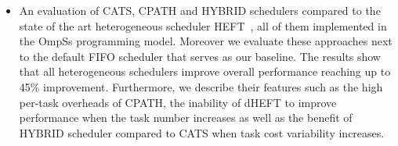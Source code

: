 \begin{itemize}
 \item{An evaluation of CATS, CPATH and HYBRID schedulers compared to the state of the art heterogeneous scheduler HEFT~\cite{HEFT}, all of them implemented in the OmpSs programming model. Moreover we evaluate these approaches next to the default FIFO scheduler that serves as our baseline.
The results show that all heterogeneous schedulers improve overall performance reaching up to 45\% improvement. Furthermore, we describe their features such as the high per-task overheads of CPATH, the inability of dHEFT to improve performance when the task number increases as well as the benefit of HYBRID scheduler compared to CATS when task cost variability increases.
}


\end{itemize}
